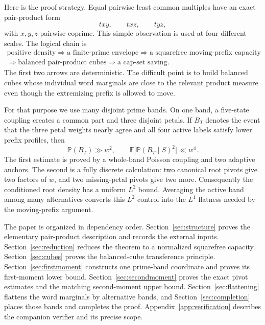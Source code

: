 \documentclass[11pt]{article}
\numberwithin{equation}{section}
\theoremstyle{plain}
\newcommand{\Pp}{\mathbb P}
\newcommand{\E}{\mathbb E}
\newcommand{\1}{\mathbf 1}
\begin{document}
Here is the proof strategy.  Equal pairwise least common multiples have an
exact pair-product form
\[
 txy,\qquad txz,\qquad tyz,
\]
with $x,y,z$ pairwise coprime.  This simple observation is used at four
different scales.  The logical chain is
\begin{equation}\label{eq:roadmap}
 \begin{gathered}
 \text{positive density}
 \Longrightarrow \text{a finite-prime envelope}
 \Longrightarrow \text{a squarefree moving-prefix capacity}\\[1mm]
 \Longrightarrow \text{balanced pair-product cubes}
 \Longrightarrow \text{a cap-set saving}.
 \end{gathered}
\end{equation}
The first two arrows are deterministic.  The difficult point is to build
balanced cubes whose individual word marginals are close to the relevant
product measure even though the extremizing prefix is allowed to move.

For that purpose we use many disjoint prime bands.  On one band, a
five-state coupling creates a common part and three disjoint petals.  If
$B_T$ denotes the event that the three petal weights nearly agree and all
four active labels satisfy lower prefix profiles, then
\[
 \Pp(B_T)\gg w^2,
 \qquad
 \E\bigl[\Pp(B_T\mid S)^2\bigr]\ll w^4.
\]
The first estimate is proved by a whole-band Poisson coupling and two
adaptive anchors.  The second is a fully discrete calculation: two
canonical root pivots give two factors of $w$, and two missing-petal pivots
give two more.  Consequently the conditioned root density has a uniform
$L^2$ bound.  Averaging the active band among many alternatives converts
this $L^2$ control into the $L^1$ flatness needed by the moving-prefix
argument.

The paper is organized in dependency order.  Section~\ref{sec:structure}
proves the elementary pair-product description and records the external
inputs.  Section~\ref{sec:reduction} reduces the theorem to a normalized
squarefree capacity.  Section~\ref{sec:cubes} proves the balanced-cube
transference principle.  Section~\ref{sec:firstmoment} constructs one
prime-band coordinate and proves its first-moment lower bound.
Section~\ref{sec:secondmoment} proves the exact pivot estimates and the
matching second-moment upper bound.  Section~\ref{sec:flattening} flattens
the word marginals by alternative bands, and Section~\ref{sec:completion}
places those bands and completes the proof.  Appendix~\ref{app:verification}
describes the companion verifier and its precise scope.
\end{document}
